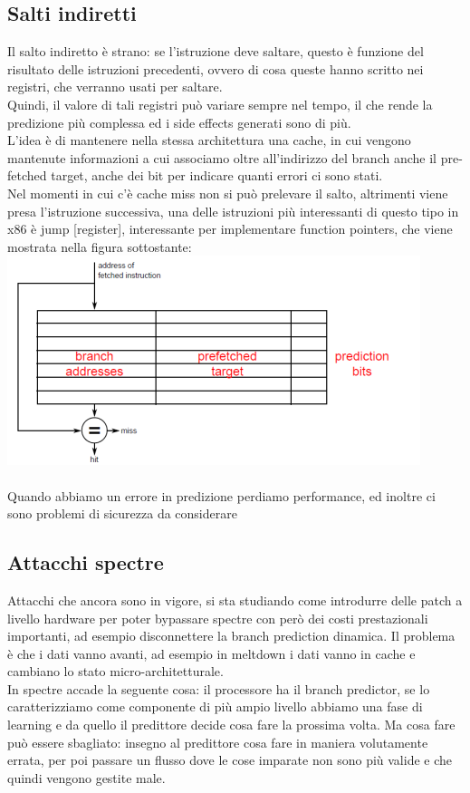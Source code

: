 \documentclass[14pt, oneside]{book}
\begin{document}
\subsection{Salti indiretti}
Il salto indiretto è strano: se l'istruzione deve saltare, questo è funzione del risultato delle istruzioni precedenti, ovvero di cosa queste hanno scritto nei registri, che verranno usati per saltare.\\ Quindi, il valore di tali registri può variare sempre nel tempo, il che rende la predizione più complessa ed i side effects generati sono di più.\\ L'idea è di mantenere nella stessa architettura una cache, in cui vengono mantenute informazioni a cui associamo oltre all'indirizzo del branch anche il pre-fetched target, anche dei bit per indicare quanti errori ci sono stati.\\ Nel momenti in cui c'è cache miss non si può prelevare il salto, altrimenti viene presa l'istruzione successiva, una delle istruzioni più interessanti di questo tipo in x86 è \textsf{jump [register]}, interessante per implementare function pointers, che viene mostrata nella figura sottostante:\\
\includegraphics[scale=0.5]{immagini/jmp_reg}\\\\
Quando abbiamo un errore in predizione perdiamo performance, ed inoltre ci sono problemi di sicurezza da considerare
\subsection{Attacchi spectre}
Attacchi che ancora sono in vigore, si sta studiando come introdurre delle patch a livello hardware per poter bypassare spectre con però dei costi prestazionali importanti, ad esempio disconnettere la branch prediction dinamica. Il problema è che i dati vanno avanti, ad esempio in meltdown i dati vanno in cache e cambiano lo stato micro-architetturale.\\ In spectre accade la seguente cosa: il processore ha il branch predictor, se lo caratterizziamo come componente di più ampio livello abbiamo una fase di learning e da quello il predittore decide cosa fare la prossima volta. Ma cosa fare può essere sbagliato: insegno al predittore cosa fare in maniera volutamente errata, per poi passare un flusso dove le cose imparate non sono più valide e che quindi vengono gestite male.
\end{document}
